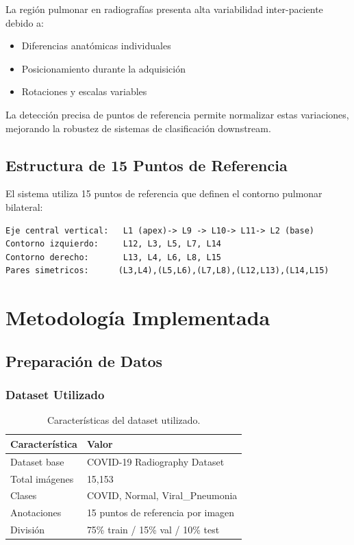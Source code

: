 \documentclass[12pt,a4paper]{article}
\begin{document}
La región pulmonar en radiografías presenta alta variabilidad inter-paciente debido a:

\begin{itemize}
    \item Diferencias anatómicas individuales
    \item Posicionamiento durante la adquisición
    \item Rotaciones y escalas variables
\end{itemize}

La detección precisa de puntos de referencia permite normalizar estas variaciones, mejorando la robustez de sistemas de clasificación downstream.

\subsection{Estructura de 15 Puntos de Referencia}

El sistema utiliza 15 puntos de referencia que definen el contorno pulmonar bilateral:

\begin{lstlisting}[style=bashstyle,numbers=none]
Eje central vertical:   L1 (apex)-> L9 -> L10-> L11-> L2 (base)
Contorno izquierdo:     L12, L3, L5, L7, L14
Contorno derecho:       L13, L4, L6, L8, L15
Pares simetricos:      (L3,L4),(L5,L6),(L7,L8),(L12,L13),(L14,L15)
\end{lstlisting}

\section{Metodología Implementada}

\subsection{Preparación de Datos}

\subsubsection{Dataset Utilizado}

\begin{table}[H]
\centering
\small
\begin{tabular}{p{5cm}p{6cm}}
\toprule
\textbf{Característica} & \textbf{Valor} \\
\midrule
Dataset base & COVID-19 Radiography Dataset \\
Total imágenes & 15,153 \\
Clases & COVID, Normal, Viral\_Pneumonia \\
Anotaciones & 15 puntos de referencia por imagen \\
División & 75\% train / 15\% val / 10\% test \\
\bottomrule
\end{tabular}
\caption{Características del dataset utilizado.}
\end{table}
\end{document}
